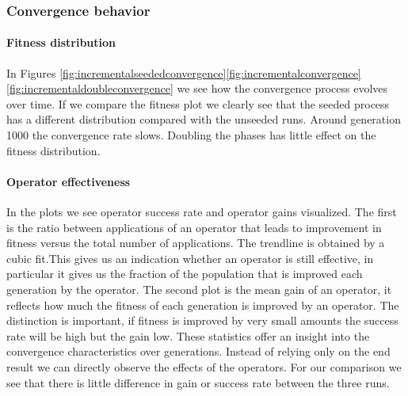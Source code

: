 \subsubsection{Convergence behavior}
\paragraph{Fitness distribution}
In Figures \ref{fig:incrementalseededconvergence}\ref{fig:incrementalconvergence}\ref{fig:incrementaldoubleconvergence} we see how the convergence process evolves over time. If we compare the fitness plot we clearly see that the seeded process has a different distribution compared with the unseeded runs. Around generation 1000 the convergence rate slows. Doubling the phases has little effect on the fitness distribution. 
\paragraph{Operator effectiveness}
In the plots we see operator success rate and operator gains visualized. The first is the ratio between applications of an operator that leads to improvement in fitness versus the total number of applications. The trendline is obtained by a cubic fit.This gives us an indication whether an operator is still effective, in particular it gives us the fraction of the population that is improved each generation by the operator. The second plot is the mean gain of an operator, it reflects how much the fitness of each generation is improved by an operator. The distinction is important, if fitness is improved by very small amounts the success rate will be high but the gain low. These statistics offer an insight into the convergence characteristics over generations. Instead of relying only on the end result we can directly observe the effects of the operators. For our comparison we see that there is little difference in gain or success rate between the three runs.
